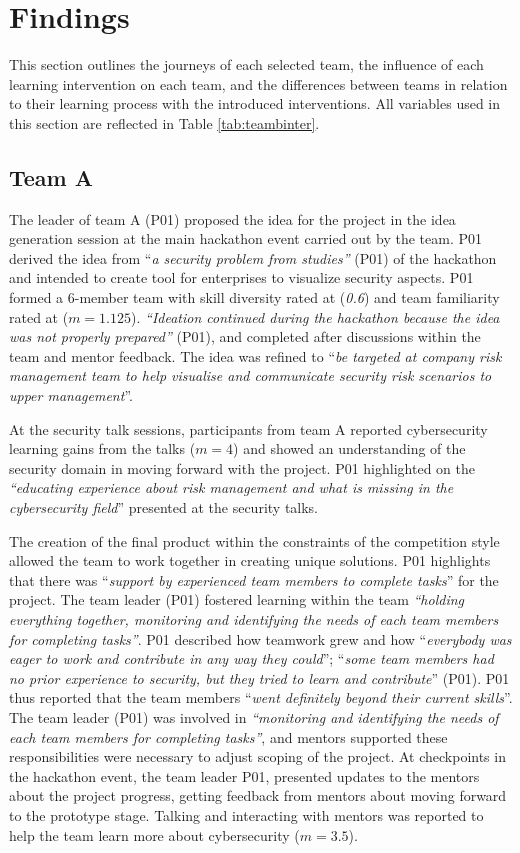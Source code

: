 \documentclass[runningheads]{llncs}
\begin{document}
\section{Findings}
This section outlines the journeys of each selected team, the influence of each learning intervention on each team, and the differences between teams in relation to their learning process with the introduced interventions. All variables used in this section are reflected in Table \ref{tab:teambinter}.

\subsection{Team A}
The leader of team A (P01) proposed the idea for the project in the idea generation session at the main hackathon event carried out by the team. P01 derived the idea from ``\textit{a security problem from studies''} (P01) of the hackathon and intended to create tool for enterprises to visualize security aspects. P01 formed a 6-member team with skill diversity rated at (\textit{0.6}) and team familiarity rated at ($m = 1.125$). \textit{``Ideation continued during the hackathon because the idea was not properly prepared''} (P01), and completed after discussions within the team and mentor feedback. The idea was refined to ``\textit{be targeted at company risk management team to help visualise and communicate security risk scenarios to upper management}''.

At the security talk sessions, participants from team A reported cybersecurity learning gains from the talks ($m = 4$) and showed an understanding of the security domain in moving forward with the project. P01 highlighted on the  \textit{``educating experience about risk management and what is missing in the cybersecurity field}'' presented at the security talks.

The creation of the final product within the constraints of the competition style allowed the team to work together in creating unique solutions. P01 highlights that there was ``\textit{support by experienced team members to complete tasks}'' for the project. The team leader (P01) fostered learning within the team \textit{``holding everything together, monitoring and identifying the needs of each team members for completing tasks''}. P01 described how teamwork grew and how ``\textit{everybody was eager to work and contribute in any way they could}''; ``\textit{some team members had no prior experience to security, but they tried to learn and contribute}'' (P01). P01 thus reported that the team members ``\textit{went definitely beyond their current skills}''. The team leader (P01) was involved in  \textit{``monitoring and identifying the needs of each team members for completing tasks''}, and mentors supported these responsibilities were necessary to adjust scoping of the project. At checkpoints in the hackathon event, the team leader P01, presented updates to the mentors about the project progress, getting feedback from mentors about moving forward to the prototype stage. Talking and interacting with mentors was reported to help the team learn more about cybersecurity ($m = 3.5$).
\end{document}
